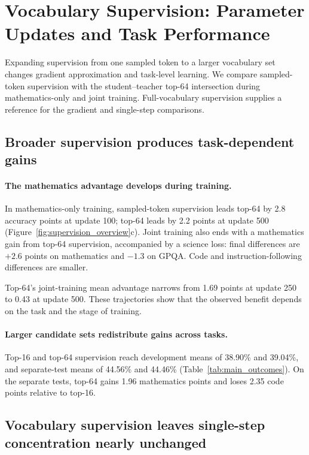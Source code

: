 \section{Vocabulary Supervision: Parameter Updates and Task Performance}
\label{sec:density}

Expanding supervision from one sampled token to a larger vocabulary set changes gradient approximation and task-level learning. We compare sampled-token supervision with the student--teacher top-64 intersection during mathematics-only and joint training. Full-vocabulary supervision supplies a reference for the gradient and single-step comparisons.

\subsection{Broader supervision produces task-dependent gains}

\paragraph{The mathematics advantage develops during training.}
In mathematics-only training, sampled-token supervision leads top-64 by 2.8 accuracy points at update 100; top-64 leads by 2.2 points at update 500 (Figure~\ref{fig:supervision_overview}c). Joint training also ends with a mathematics gain from top-64 supervision, accompanied by a science loss: final differences are $+2.6$ points on mathematics and $-1.3$ on GPQA. Code and instruction-following differences are smaller.

Top-64's joint-training mean advantage narrows from 1.69 points at update 250 to 0.43 at update 500. These trajectories show that the observed benefit depends on the task and the stage of training.

\paragraph{Larger candidate sets redistribute gains across tasks.}
Top-16 and top-64 supervision reach development means of 38.90\% and 39.04\%, and separate-test means of 44.56\% and 44.46\% (Table~\ref{tab:main_outcomes}). On the separate tests, top-64 gains 1.96 mathematics points and loses 2.35 code points relative to top-16.





\subsection{Vocabulary supervision leaves single-step concentration nearly unchanged}

